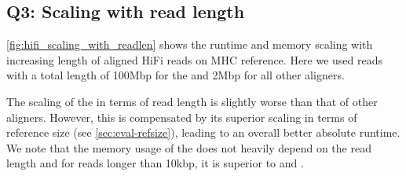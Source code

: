 \subsection{Q3: Scaling with read length}

\cref{fig:hifi_scaling_with_readlen} shows the runtime and memory scaling with
increasing length of aligned HiFi reads on MHC reference. Here we used reads
with a total length of 100Mbp for the \seedh and 2Mbp for all other aligners.

The scaling of the \seedh in terms of read length is slightly worse than that of
other aligners. However, this is compensated by its superior scaling in terms of
reference size (see \cref{sec:eval-refsize}), leading to an overall better
absolute runtime. We note that the memory usage of the \seedh does not heavily
depend on the read length and for reads longer than 10kbp, it is superior to
\graphaligner and \vargas.

